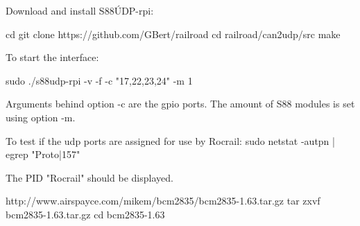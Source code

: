 Download and install S88ÚDP-rpi:

cd
git clone https://github.com/GBert/railroad
cd railroad/can2udp/src
make

To start the interface: 

sudo ./s88udp-rpi -v -f -c "17,22,23,24" -m 1

Arguments behind option -c are the gpio ports. The amount of S88 modules is set using option -m.

To test if the udp ports are assigned for use by Rocrail:
sudo netstat -autpn | egrep "Proto|157"

The PID "Rocrail" should be displayed.

http://www.airspayce.com/mikem/bcm2835/bcm2835-1.63.tar.gz 
tar zxvf bcm2835-1.63.tar.gz
cd bcm2835-1.63

